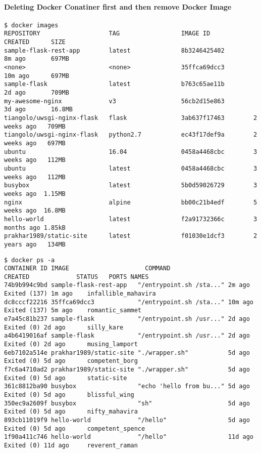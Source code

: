 \paragraph{Deleting Docker Conatiner first and then remove Docker Image}


\begin{lstlisting}[basicstyle=\tiny\ttfamily]
$ docker images
REPOSITORY                   TAG                 IMAGE ID            CREATED      SIZE
sample-flask-rest-app        latest              8b3246425402        8m ago       697MB
<none>                       <none>              35ffca69dcc3        10m ago      697MB
sample-flask                 latest              b763c65ae11b        2d ago       709MB
my-awesome-nginx             v3                  56cb2d15e863        3d ago       16.8MB
tiangolo/uwsgi-nginx-flask   flask               3ab637f17463        2 weeks ago   709MB
tiangolo/uwsgi-nginx-flask   python2.7           ec43f17def9a        2 weeks ago   697MB
ubuntu                       16.04               0458a4468cbc        3 weeks ago   112MB
ubuntu                       latest              0458a4468cbc        3 weeks ago   112MB
busybox                      latest              5b0d59026729        3 weeks ago  1.15MB
nginx                        alpine              bb00c21b4edf        5 weeks ago  16.8MB
hello-world                  latest              f2a91732366c        3 months ago 1.85kB
prakhar1989/static-site      latest              f01030e1dcf3        2 years ago   134MB
\end{lstlisting}


\begin{lstlisting}[basicstyle=\tiny\ttfamily]
$ docker ps -a
CONTAINER ID IMAGE                     COMMAND                  CREATED             STATUS   PORTS NAMES
74b9b994c9bd sample-flask-rest-app   "/entrypoint.sh /sta..." 2m ago  Exited (137) 1m ago    infallible_mahavira
dc8cccf22216 35ffca69dcc3            "/entrypoint.sh /sta..." 10m ago Exited (137) 5m ago    romantic_sammet
e7a45c81b237 sample-flask            "/entrypoint.sh /usr..." 2d ago  Exited (0) 2d ago      silly_kare
a4b6419016af sample-flask            "/entrypoint.sh /usr..." 2d ago  Exited (0) 2d ago      musing_lamport
6eb7102a514e prakhar1989/static-site "./wrapper.sh"           5d ago  Exited (0) 5d ago      competent_borg
f7c6a4710ad2 prakhar1989/static-site "./wrapper.sh"           5d ago  Exited (0) 5d ago      static-site
361c8812ba90 busybox                 "echo 'hello from bu..." 5d ago  Exited (0) 5d ago      blissful_wing
350ec9a2609f busybox                 "sh"                     5d ago  Exited (0) 5d ago      nifty_mahavira
893cb11019f9 hello-world             "/hello"                 5d ago  Exited (0) 5d ago      competent_spence
1f90a411c746 hello-world             "/hello"                 11d ago Exited (0) 11d ago     reverent_raman
\end{lstlisting}

